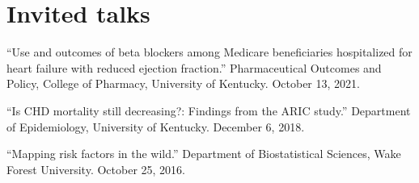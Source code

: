\documentclass[10pt,letterpaper]{article}
\renewenvironment{itemize}{
  \begin{list}{}{
    \setlength{\leftmargin}{1.5em}
    \setlength{\itemsep}{0.25em}
    \setlength{\parskip}{0pt}
    \setlength{\parsep}{0.25em}
  }
}{
  \end{list}
}
\begin{document}
\section*{Invited talks}
\begin{itemize}
    \item ``Use and outcomes of beta blockers among Medicare beneficiaries hospitalized for heart failure with reduced ejection fraction.'' Pharmaceutical Outcomes and Policy, College of Pharmacy, University of Kentucky. October 13, 2021.
    \item ``Is CHD mortality still decreasing?: Findings from the ARIC study.'' Department of Epidemiology, University of Kentucky. December 6, 2018.
    \item ``Mapping risk factors in the wild.'' Department of Biostatistical Sciences, Wake Forest University. October 25, 2016.
\end{itemize}
\end{document}
